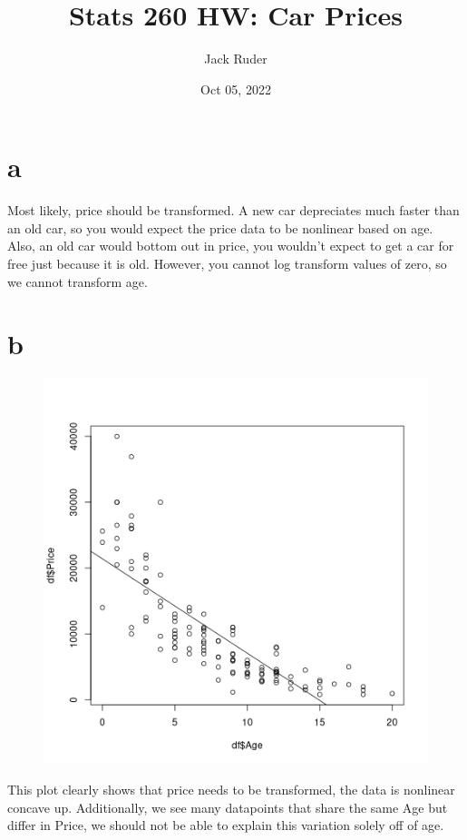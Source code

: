\documentclass[a4paper]{article}
\title{Stats 260 HW: Car Prices}
\date{Oct 05, 2022}
\author{Jack Ruder}
\begin{document}
\doublespacing
\maketitle

\section*{a}
Most likely, price should be transformed. A new car depreciates much faster than an old car, so you would expect the price data to be nonlinear based on age. Also, an old car would bottom out in price, you wouldn't expect to get a car for free just because it is old. However, you cannot log transform values of zero, so we cannot transform age. 

\section*{b}%
\label{sec:b}
\begin{figure}[H]
	\centering
	\includegraphics[width=\textwidth]{"../PvA.png"}
\end{figure}
This plot clearly shows that price needs to be transformed, the data is nonlinear concave up. Additionally, we see many datapoints that share the same Age but differ in Price, we should not be able to explain this variation solely off of age.
\end{document}

